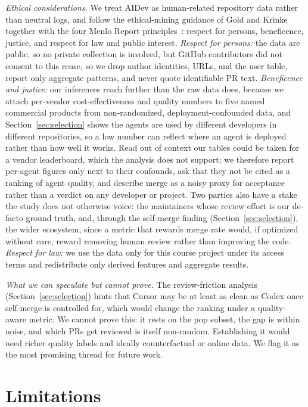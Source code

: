 \documentclass[sigconf,nonacm]{acmart}
\begin{document}
\emph{Ethical considerations.} We treat AIDev as human-related repository data rather than neutral logs, and follow the ethical-mining guidance of Gold and Krinke~\cite{gold2022ethics} together with the four Menlo Report principles~\cite{menlo2012}: respect for persons, beneficence, justice, and respect for law and public interest. \emph{Respect for persons:} the data are public, so no private collection is involved, but GitHub contributors did not consent to this reuse, so we drop author identities, URLs, and the user table, report only aggregate patterns, and never quote identifiable PR text. \emph{Beneficence and justice:} our inferences reach further than the raw data does, because we attach per-vendor cost-effectiveness and quality numbers to five named commercial products from non-randomized, deployment-confounded data, and Section~\ref{sec:selection} shows the agents are used by different developers in different repositories, so a low number can reflect where an agent is deployed rather than how well it works. Read out of context our tables could be taken for a vendor leaderboard, which the analysis does not support; we therefore report per-agent figures only next to their confounds, ask that they not be cited as a ranking of agent quality, and describe merge as a noisy proxy for acceptance rather than a verdict on any developer or project. Two parties also have a stake the study does not otherwise voice: the maintainers whose review effort is our de-facto ground truth, and, through the self-merge finding (Section~\ref{sec:selection}), the wider ecosystem, since a metric that rewards merge rate would, if optimized without care, reward removing human review rather than improving the code. \emph{Respect for law:} we use the data only for this course project under its access terms and redistribute only derived features and aggregate results.

\emph{What we can speculate but cannot prove.} The review-friction analysis (Section~\ref{sec:selection}) hints that Cursor may be at least as clean as Codex once self-merge is controlled for, which would change the ranking under a quality-aware metric. We cannot prove this: it rests on the pop subset, the gap is within noise, and which PRs get reviewed is itself non-random. Establishing it would need richer quality labels and ideally counterfactual or online data. We flag it as the most promising thread for future work.

\section{Limitations}\label{sec:limitations}
\end{document}
